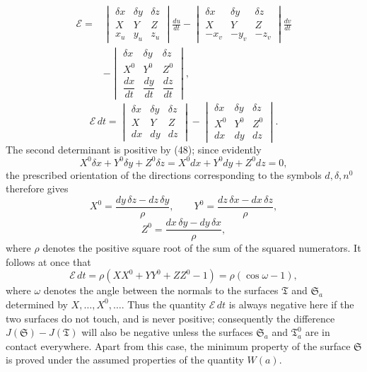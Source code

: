 \documentclass[11pt,a4paper,leqno]{article}
\begin{document}
\[
\begin{aligned}
\mathcal{E}={}&
\begin{vmatrix}
\delta x&\delta y&\delta z\\ X&Y&Z\\ x_u&y_u&z_u
\end{vmatrix}\frac{du}{dt}
-\begin{vmatrix}
\delta x&\delta y&\delta z\\ X&Y&Z\\ -x_v&-y_v&-z_v
\end{vmatrix}\frac{dv}{dt}\\
&-\begin{vmatrix}
\delta x&\delta y&\delta z\\ X^0&Y^0&Z^0\\
\dfrac{dx}{dt}&\dfrac{dy}{dt}&\dfrac{dz}{dt}
\end{vmatrix},
\end{aligned}
\]
\[
\mathcal{E}\,dt=
\begin{vmatrix}
\delta x&\delta y&\delta z\\ X&Y&Z\\ dx&dy&dz
\end{vmatrix}
-\begin{vmatrix}
\delta x&\delta y&\delta z\\ X^0&Y^0&Z^0\\ dx&dy&dz
\end{vmatrix}.
\]
The second determinant is positive by (48); since evidently
\[
X^0\delta x+Y^0\delta y+Z^0\delta z
=X^0dx+Y^0dy+Z^0dz=0,
\]
the prescribed orientation of the directions corresponding to the symbols
$d,\delta,n^0$ therefore gives
\[
X^0=\frac{dy\,\delta z-dz\,\delta y}{\rho},\qquad
Y^0=\frac{dz\,\delta x-dx\,\delta z}{\rho},
\]
\[
Z^0=\frac{dx\,\delta y-dy\,\delta x}{\rho},
\]
where $\rho$ denotes the positive square root of the sum of the squared
numerators. It follows at once that
\[
\mathcal{E}\,dt=\rho(XX^0+YY^0+ZZ^0-1)=\rho(\cos\omega-1),
\]
where $\omega$ denotes the angle between the normals to the surfaces
$\mathfrak{T}$ and $\mathfrak{S}_a$ determined by
$X,\ldots,X^0,\ldots$. Thus the quantity $\mathcal{E}\,dt$ is always
negative here if the two surfaces do not touch, and is never positive;
consequently the difference $J(\mathfrak{S})-J(\mathfrak{T})$ will also be
negative unless the surfaces $\mathfrak{S}_a$ and $\mathfrak{T}_a^0$ are in
contact everywhere. Apart from this case, the minimum property of the
surface $\mathfrak{S}$ is proved under the assumed properties of the
quantity $W(a)$.
\end{document}
